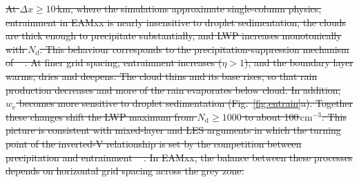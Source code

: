\documentclass[acp, manuscript]{copernicus}
\newcommand{\Nd}{N_\mathrm{d}}
\newcommand{\we}{w_\mathrm{e}}
\newcommand{\dx}{\Delta x}
\newcommand{\cmthree}{\mathrm{cm^{-3}}}
\providecommand{\DIFdel}[1]{{\protect\color{red}\sout{#1}}} %
\begin{document}


\DIFdel{At $\dx\geq10$\,km, where the simulations approximate single-column physics, entrainment in EAMxx is nearly insensitive to droplet sedimentation, the clouds are thick enough to precipitate substantially, and LWP increases monotonically with $\Nd$. This behaviour corresponds to the precipitation-suppression mechanism of \mbox{%
\citet{albrecht1989}}\hskip0pt%
. At finer grid spacing, entrainment increases ($\eta>1$), and the boundary layer warms, dries and deepens. The cloud thins and its base rises, so that rain production decreases and more of the rain evaporates below cloud. In addition, $\we$ becomes more sensitive to droplet sedimentation (Fig.~\ref{fig:entrain}a). Together these changes shift the LWP maximum from $\Nd\geq1000$ to about 100\,$\cmthree$. This picture is consistent with mixed-layer and LES arguments in which the turning point of the inverted-V relationship is set by the competition between precipitation and entrainment \mbox{%
\citep{ackerman2004,wood2007,hoffmann2020,hoffmann2024}}\hskip0pt%
. In EAMxx, the balance between these processes depends on horizontal grid spacing across the grey zone.
}%
\end{document}
